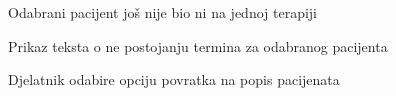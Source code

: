\begin{packed_item}
\begin{packed_item}
						\item[3.a] Odabrani pacijent još nije bio ni na jednoj terapiji
						\item[] \begin{packed_enum}
							\item Prikaz teksta o ne postojanju termina za odabranog pacijenta
							\item Djelatnik odabire opciju povratka na popis pacijenata
											 							
						\end{packed_enum}
						
					\end{packed_item}
				\end{packed_item}
				
				\noindent {}
